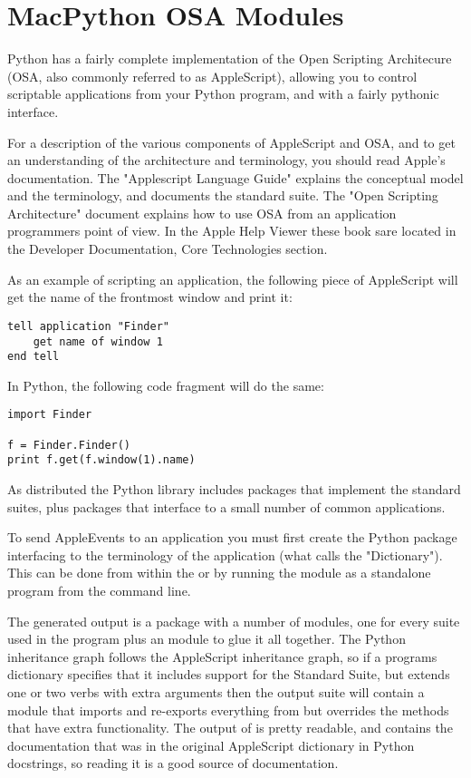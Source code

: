 \chapter{MacPython OSA Modules \label{scripting}}

Python has a fairly complete implementation of the Open Scripting
Architecure (OSA, also commonly referred to as AppleScript), allowing
you to control scriptable applications from your Python program,
and with a fairly pythonic interface. 

For a description of the various components of AppleScript and OSA, and
to get an understanding of the architecture and terminology, you should
read Apple's documentation. The "Applescript Language Guide" explains
the conceptual model and the terminology, and documents the standard
suite. The "Open Scripting Architecture" document explains how to use
OSA from an application programmers point of view. In the Apple Help
Viewer these book sare located in the Developer Documentation, Core
Technologies section.


As an example of scripting an application, the following piece of
AppleScript will get the name of the frontmost  window
and print it:
	
\begin{verbatim}
tell application "Finder"
    get name of window 1
end tell
\end{verbatim}

In Python, the following code fragment will do the same:

\begin{verbatim}
import Finder

f = Finder.Finder()
print f.get(f.window(1).name)
\end{verbatim}

As distributed the Python library includes packages that implement the
standard suites, plus packages that interface to a small number of
common applications.

To send AppleEvents to an application you must first create the Python
package interfacing to the terminology of the application (what
 calls the "Dictionary"). This can be done from
within the  or by running the
 module as a standalone program from the command
line.

The generated output is a package with a number of modules, one for
every suite used in the program plus an  module to glue
it all together. The Python inheritance graph follows the AppleScript
inheritance graph, so if a programs dictionary specifies that it
includes support for the Standard Suite, but extends one or two verbs
with extra arguments then the output suite will contain a module
 that imports and re-exports everything from
 but overrides the methods that have
extra functionality. The output of  is pretty
readable, and contains the documentation that was in the original
AppleScript dictionary in Python docstrings, so reading it is a good
source of documentation.


